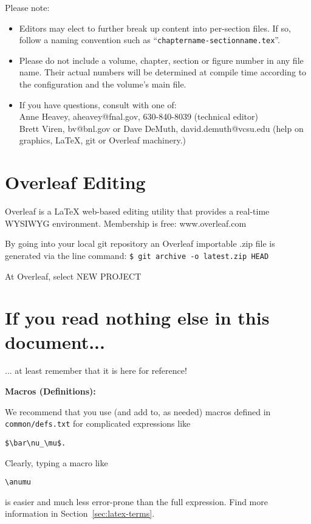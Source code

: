 
Please note:
\begin{itemize}
\item Editors may elect to further break up content into per-section files. If so, follow a naming convention such as ``\texttt{chaptername-sectionname.tex}''.
\item Please do not include a volume, chapter, section or figure number in any file name. Their actual numbers will be determined at compile time according to the configuration and the volume's main file. 
\item If you have questions, consult with one of: \\
  Anne Heavey, aheavey@fnal.gov, 630-840-8039 (technical editor)\\
  Brett Viren, bv@bnl.gov or Dave DeMuth, david.demuth@vcsu.edu (help on graphics, \LaTeX{}, git or Overleaf machinery.)
\end{itemize}

\section{Overleaf Editing}
\label{sec:gen-overleaf}

Overleaf is a \LaTeX{} web-based editing utility that provides a real-time WYSIWYG environment. Membership is free: www.overleaf.com

By going into your local git repository an Overleaf importable .zip file is generated via the line command: \texttt{\$ git archive -o latest.zip HEAD}

At Overleaf, select NEW PROJECT

\section{If you read nothing else in this document...}
\label{sec:gen-nothing}

... at least remember that it is here for reference!

\textbf{Macros (Definitions):}

\begin{framed}
We recommend that you use (and add to, as needed) macros defined in \texttt{common/defs.txt} for complicated expressions like 
\begin{verbatim}
$\bar\nu_\mu$.
\end{verbatim}
 Clearly, typing a macro like 
 \begin{verbatim}
\anumu
\end{verbatim} 
is easier and much less error-prone than the full expression.
Find more information in Section~\ref{sec:latex-terms}.
\end{framed}

